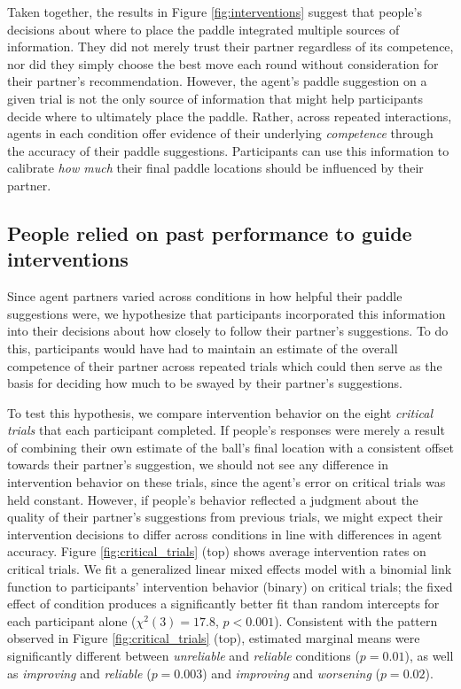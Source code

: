 \documentclass[10pt,letterpaper]{article}
\begin{document}
Taken together, the results in Figure \ref{fig:interventions} suggest that people's decisions about where to place the paddle integrated multiple sources of information. They did not merely trust their partner regardless of its competence, nor did they simply choose the best move each round without consideration for their partner's recommendation. However, the agent's paddle suggestion on a given trial is not the only source of information that might help participants decide where to ultimately place the paddle. Rather, across repeated interactions, agents in each condition offer evidence of their underlying \textit{competence} through the accuracy of their paddle suggestions. Participants can use this information to calibrate \textit{how much} their final paddle locations should be influenced by their partner. 


\subsection{People relied on past performance to guide interventions}

Since agent partners varied across conditions in how helpful their paddle suggestions were, we hypothesize that participants incorporated this information into their decisions about how closely to follow their partner's suggestions. To do this, participants would have had to maintain an estimate of the overall competence of their partner across repeated trials which could then serve as the basis for deciding how much to be swayed by their partner's suggestions. 

To test this hypothesis, we compare intervention behavior on the eight \textit{critical trials} that each participant completed. If people's responses were merely a result of combining their own estimate of the ball's final location with a consistent offset towards their partner's suggestion, we should not see any difference in intervention behavior on these trials, since the agent's error on critical trials was held constant. However, if people's behavior reflected a judgment about the quality of their partner's suggestions from previous trials, we might expect their intervention decisions to differ across conditions in line with differences in agent accuracy. Figure \ref{fig:critical_trials} (top) shows average intervention rates on critical trials. We fit a generalized linear mixed effects model with a binomial link function to participants' intervention behavior (binary) on critical trials; the fixed effect of condition produces a significantly better fit than random intercepts for each participant alone ($\chi^2(3) = 17.8$, $p < 0.001$). Consistent with the pattern observed in Figure \ref{fig:critical_trials} (top), estimated marginal means were significantly different between \textit{unreliable} and \textit{reliable} conditions ($p = 0.01$), as well as \textit{improving} and \textit{reliable} ($p = 0.003$) and \textit{improving} and \textit{worsening} ($p = 0.02$).
\end{document}

